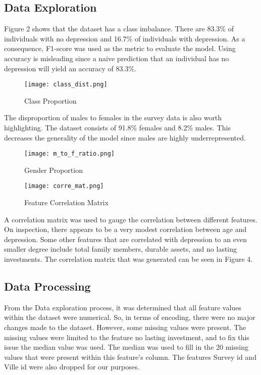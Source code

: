 \documentclass[conference]{IEEEtran}
\begin{document}
\subsection{Data Exploration}
Figure 2 shows that the dataset has a class imbalance. There are 83.3\% of individuals with no depression and 16.7\% of individuals with depression. As a consequence, F1-score was used as the metric to evaluate the model. Using accuracy is misleading since a naive prediction that an individual has no depression will yield an accuracy of 83.3\%.
\begin{figure}[hbt!]
\centering
\texttt{[image: class\_dist.png]}
\caption{Class Proportion\label{overflow}}
\end{figure}

The disproportion of males to females in the survey data is also worth highlighting. The dataset consists of 91.8\% females and 8.2\% males. This decreases the generality of the model since males are highly underrepresented.
\begin{figure}[hbt!]
\centering
\texttt{[image: m\_to\_f\_ratio.png]}
\caption{Gender Proportion\label{overflow}}
\end{figure}

\begin{figure}[ht!]
\centering
\texttt{[image: corre\_mat.png]}
\caption{Feature Correlation Matrix\label{overflow}}
\end{figure}

A correlation matrix was used to gauge the correlation between different features. On inspection, there appears to be a very modest correlation between age and depression. Some other features that are correlated with depression to an even smaller degree include total family members, durable assets, and no lasting investments. The correlation matrix that was generated can be seen in Figure 4.


\subsection{Data Processing}
From the Data exploration process, it was determined that all feature values within the dataset were numerical. So, in terms of encoding, there were no major changes made to the dataset. However, some missing values were present. The missing values were limited to the feature no lasting investment, and to fix this issue the median value was used. The median was used to fill in the 20 missing values that were present within this feature's column. The features Survey id and Ville id were also dropped for our purposes.
\end{document}
